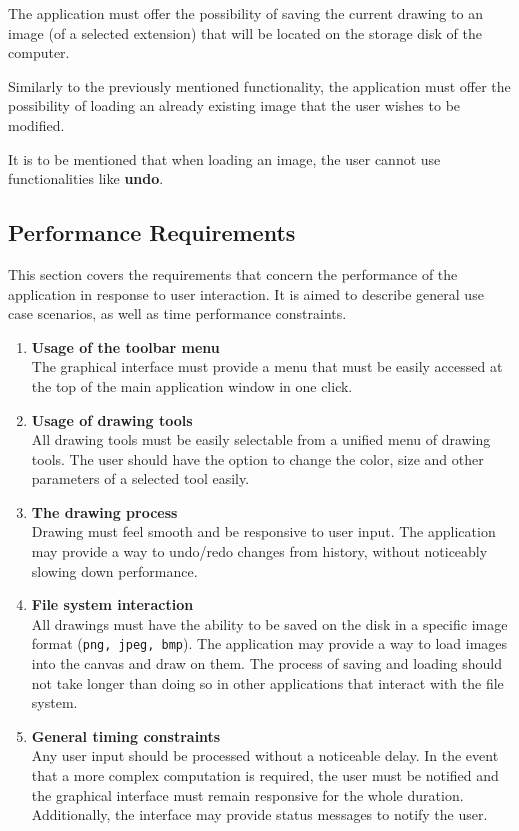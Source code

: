 \documentclass{article}
\begin{document}
The application must offer the possibility of saving the current drawing to an image (of a selected extension) that will be located on the storage disk of the computer.

Similarly to the previously mentioned functionality, the application must offer the possibility of loading an already existing image that the user wishes to be modified.

It is to be mentioned that when loading an image, the user cannot use functionalities like \textbf{undo}.

\subsection{Performance Requirements}
This section covers the requirements that concern the performance of the application in response to user interaction. It is aimed to describe general use case scenarios, as well as time performance constraints.
\begin{enumerate}
\item \textbf{Usage of the toolbar menu}
\\
The graphical interface must provide a menu that must be easily accessed at the top of the main application window in one click.
\item \textbf{Usage of drawing tools}
\\
All drawing tools must be easily selectable from a unified menu of drawing tools. The user should have the option to change the color, size and other parameters of a selected tool easily.
\item \textbf{The drawing process}
\\
Drawing must feel smooth and be responsive to user input. The application may provide a way to undo/redo changes from history, without noticeably slowing down performance.
\item \textbf{File system interaction}
\\
All drawings must have the ability to be saved on the disk in a specific image format (\texttt{png, jpeg, bmp}). The application may provide a way to load images into the canvas and draw on them. The process of saving and loading should not take longer than doing so in other applications that interact with the file system.
\item \textbf{General timing constraints}
\\
Any user input should be processed without a noticeable delay. In the event that a more complex computation is required, the user must be notified and the graphical interface must remain responsive for the whole duration. Additionally, the interface may provide status messages to notify the user.
\end{enumerate}
\end{document}
